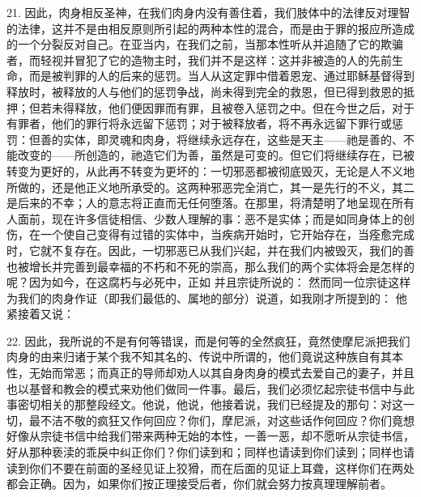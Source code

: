 21. 因此，肉身相反圣神，在我们肉身内没有善住着，我们肢体中的法律反对理智的法律，这并不是由相反原则所引起的两种本性的混合，而是由于罪的报应所造成的一个分裂反对自己。在亚当内，在我们之前，当那本性听从并追随了它的欺骗者，而轻视并冒犯了它的造物主时，我们并不是这样：这并非被造的人的先前生命，而是被判罪的人的后来的惩罚。当人从这定罪中借着恩宠、通过耶稣基督得到释放时，被释放的人与他们的惩罚争战，尚未得到完全的救恩，但已得到救恩的抵押；但若未得释放，他们便因罪而有罪，且被卷入惩罚之中。但在今世之后，对于有罪者，他们的罪行将永远留下惩罚；对于被释放者，将不再永远留下罪行或惩罚：但善的实体，即灵魂和肉身，将继续永远存在，这些是天主——祂是善的、不能改变的——所创造的，祂造它们为善，虽然是可变的。但它们将继续存在，已被转变为更好的，从此再不转变为更坏的：一切邪恶都被彻底毁灭，无论是人不义地所做的，还是他正义地所承受的。这两种邪恶完全消亡，其一是先行的不义，其二是后来的不幸；人的意志将正直而无任何堕落。在那里，将清楚明了地呈现在所有人面前，现在许多信徒相信、少数人理解的事：恶不是实体；而是如同身体上的创伤，在一个使自己变得有过错的实体中，当疾病开始时，它开始存在，当痊愈完成时，它就不复存在。因此，一切邪恶已从我们兴起，并在我们内被毁灭，我们的善也被增长并完善到最幸福的不朽和不死的崇高，那么我们的两个实体将会是怎样的呢？因为如今，在这腐朽与必死中，正如 并且宗徒所说的： 然而同一位宗徒这样为我们的肉身作证（即我们最低的、属地的部分）说道，如我刚才所提到的： 他紧接着又说：\par

22. 因此，我所说的不是有何等错误，而是何等的全然疯狂，竟然使摩尼派把我们肉身的由来归诸于某个我不知其名的、传说中所谓的，他们竟说这种族自有其本性，无始而常恶；而真正的导师却劝人以其自身肉身的模式去爱自己的妻子，并且也以基督和教会的模式来劝他们做同一件事。最后，我们必须忆起宗徒书信中与此事密切相关的那整段经文。他说，他说，他接着说，我们已经提及的那句：对这一切，最不洁不敬的疯狂又作何回应？你们，摩尼派，对这些话作何回应？你们竟想好像从宗徒书信中给我们带来两种无始的本性，一善一恶，却不愿听从宗徒书信，好从那种亵渎的乖戾中纠正你们？你们读到和；同样也请读到你们读到；同样也请读到你们不要在前面的圣经见证上狡猾，而在后面的见证上耳聋，这样你们在两处都会正确。因为，如果你们按正理接受后者，你们就会努力按真理理解前者。\par

